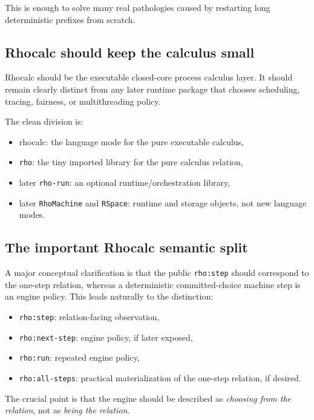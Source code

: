 \documentclass[11pt]{article}
\newcommand{\code}[1]{\texttt{#1}}
\newcommand{\lang}[1]{\textsf{#1}}
\begin{document}
This is enough to solve many real pathologies caused by restarting long deterministic prefixes from scratch.

\subsection{Rhocalc should keep the calculus small}

Rhocalc should be the executable closed-core process calculus layer. It should remain clearly distinct from any later runtime package that chooses scheduling, tracing, fairness, or multithreading policy.

The clean division is:

\begin{itemize}
  \item \lang{rhocalc}: the language mode for the pure executable calculus,
  \item \code{rho}: the tiny imported library for the pure calculus relation,
  \item later \code{rho-run}: an optional runtime/orchestration library,
  \item later \code{RhoMachine} and \code{RSpace}: runtime and storage objects, not new language modes.
\end{itemize}

\subsection{The important Rhocalc semantic split}

A major conceptual clarification is that the public \code{rho:step} should correspond to the one-step relation, whereas a deterministic committed-choice machine step is an engine policy. This leads naturally to the distinction:

\begin{itemize}
  \item \code{rho:step}: relation-facing observation,
  \item \code{rho:next-step}: engine policy, if later exposed,
  \item \code{rho:run}: repeated engine policy,
  \item \code{rho:all-steps}: practical materialization of the one-step relation, if desired.
\end{itemize}

The crucial point is that the engine should be described as \emph{choosing from the relation}, not as \emph{being the relation}.
\end{document}
